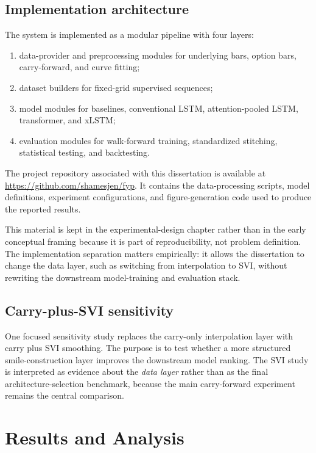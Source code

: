 \documentclass[12pt]{report}
\begin{document}
\section{Implementation architecture}
The system is implemented as a modular pipeline with four layers:
\begin{enumerate}[leftmargin=1.2cm]
    \item data-provider and preprocessing modules for underlying bars, option bars, carry-forward, and curve fitting;
    \item dataset builders for fixed-grid supervised sequences;
    \item model modules for baselines, conventional LSTM, attention-pooled LSTM, transformer, and xLSTM;
    \item evaluation modules for walk-forward training, standardized stitching, statistical testing, and backtesting.
\end{enumerate}

The project repository associated with this dissertation is available at \url{https://github.com/shamesjen/fyp}. It contains the data-processing scripts, model definitions, experiment configurations, and figure-generation code used to produce the reported results.

This material is kept in the experimental-design chapter rather than in the early conceptual framing because it is part of reproducibility, not problem definition. The implementation separation matters empirically: it allows the dissertation to change the data layer, such as switching from interpolation to SVI, without rewriting the downstream model-training and evaluation stack.

\section{Carry-plus-SVI sensitivity}
One focused sensitivity study replaces the carry-only interpolation layer with carry plus SVI smoothing. The purpose is to test whether a more structured smile-construction layer improves the downstream model ranking. The SVI study is interpreted as evidence about the \emph{data layer} rather than as the final architecture-selection benchmark, because the main carry-forward experiment remains the central comparison.

\chapter{Results and Analysis}
\end{document}
